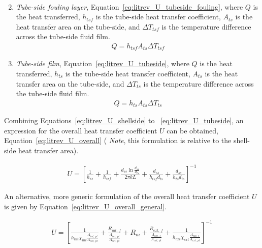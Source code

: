 \begin{enumerate}
\begin{align}
            \end{align}
        \item \emph{Tube-side fouling layer}, Equation~\ref{eq:litrev_U_tubeside_fouling}, where \(Q\) is the heat transferred, \(h_{tsf}\) is the tube-side heat transfer coefficient, \(A_{ts}\) is the heat transfer area on the tube-side, and \(\Delta T_{tsf}\) is the temperature difference across the tube-side fluid film.
            \begin{align}
                Q = h_{tsf}A_{ts}\Delta T_{tsf} \label{eq:litrev_U_tubeside_fouling}
            \end{align}
        \item \emph{Tube-side film}, Equation~\ref{eq:litrev_U_tubeside}, where \(Q\) is the heat transferred, \(h_{ts}\) is the tube-side heat transfer coefficient, \(A_{ts}\) is the heat transfer area on the tube-side, and \(\Delta T_{ts}\) is the temperature difference across the tube-side fluid film.
            \begin{align}
                Q = h_{ts}A_{ts}\Delta T_{ts} \label{eq:litrev_U_tubeside}
            \end{align}
    \end{enumerate}

    Combining Equations~\ref{eq:litrev_U_shellside} to ~\ref{eq:litrev_U_tubeside}, an expression for the overall heat transfer coefficient \(U\) can be obtained, Equation~\ref{eq:litrev_U_overall} ( \emph{Note}, this formulation is relative to the shell-side heat transfer area).

    \begin{align}
        U = \left[\frac{1}{h_{ss}} + \frac{1}{h_{ssf}}+ \frac{d_{ss}\ln \frac{d_{ss}}{d_{ts}}}{2\pi kL} + \frac{d_{ss}}{h_{tsf}d_{ts}} + \frac{d_{ss}}{h_{ts}d_{ts}}\right]^{-1} \label{eq:litrev_U_overall}
    \end{align}

    An alternative, more generic formulation of the overall heat transfer coefficient \(U\) is given by Equation~\ref{eq:litrev_U_overall_general}.

    \begin{align}
        U = \left[\frac{1}{h_{int}\chi_{int}\frac{A_{int,\;pt}}{A_{ext,\;pt}}} +  \frac{R_{int,\;f}}{\frac{A_{int,\;pt}}{A_{ext,\;pt}}} + R_{m} + \frac{R_{ext,\;f}}{\frac{A_{ext,\;t}}{A_{ext,\;pt}}} + \frac{1}{h_{ext}\chi_{ext}\frac{A_{ext,\;t}}{A_{ext,\;pt}}}\right]^{-1} \label{eq:litrev_U_overall_general}
    \end{align}

